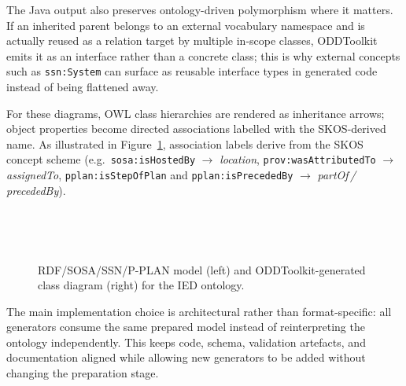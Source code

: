 The Java output also preserves ontology-driven polymorphism where it matters. If an inherited parent belongs to an external vocabulary namespace and is actually reused as a relation target by multiple in-scope classes, ODDToolkit emits it as an interface rather than a concrete class; this is why external concepts such as \texttt{ssn:System} can surface as reusable interface types in generated code instead of being flattened away.

For these diagrams, OWL class hierarchies are rendered as inheritance arrows; object properties become directed associations labelled with the SKOS-derived name. As illustrated in Figure~\ref{fig:class-diagram}, association labels derive from the SKOS concept scheme (e.g.\ \texttt{sosa:isHostedBy} $\rightarrow$ \emph{location}, \texttt{prov:wasAttributedTo} $\rightarrow$ \emph{assignedTo}, \texttt{pplan:isStepOfPlan} and \texttt{pplan:isPrecededBy} $\rightarrow$ \emph{partOf\,/\,precededBy}). 

\begin{figure}[t]
    \centering
    \begin{minipage}[b]{0.68\linewidth}
        \centering
        \\[-0.2em]
    \end{minipage}
    \hfill
    \begin{minipage}[b]{0.28\linewidth}
        \centering
        \\[-0.2em]
    \end{minipage}
  \caption{RDF/SOSA/SSN/P-PLAN model (left) and ODDToolkit-generated class diagram (right) for the IED ontology.}
  \label{fig:class-diagram}
\end{figure}

The main implementation choice is architectural rather than format-specific: all generators consume the same prepared model instead of reinterpreting the ontology independently. This keeps code, schema, validation artefacts, and documentation aligned while allowing new generators to be added without changing the preparation stage.

